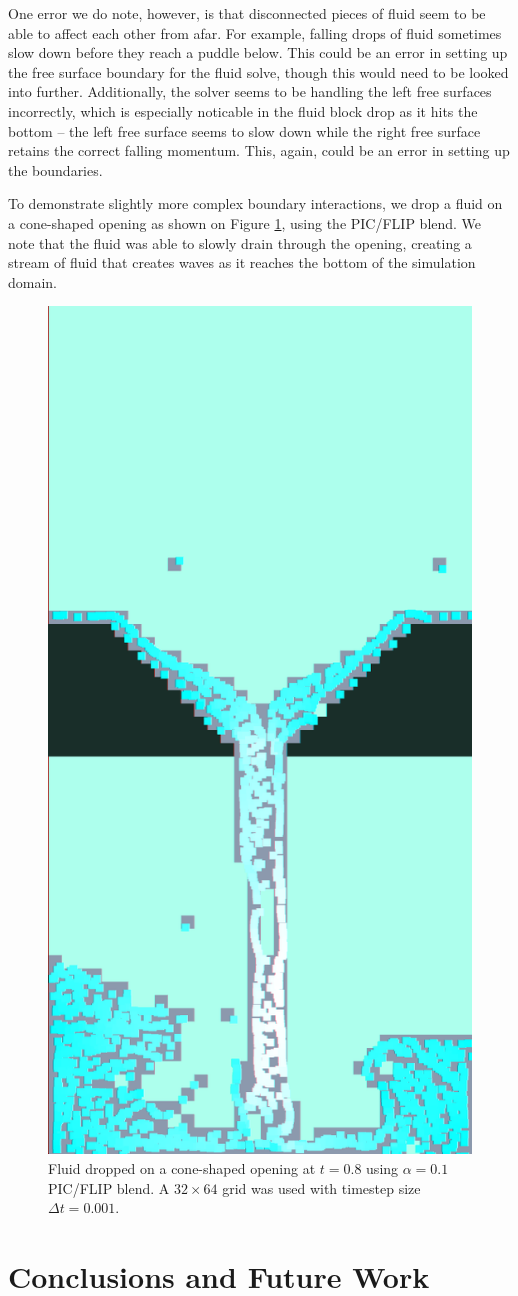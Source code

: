 \documentclass[sigconf]{acmart}
\begin{document}
One error we do note, however, is that disconnected pieces of fluid seem to be able to affect each other from afar. For example, falling drops of fluid sometimes slow down before they reach a puddle below. This could be an error in setting up the free surface boundary for the fluid solve, though this would need to be looked into further. Additionally, the solver seems to be handling the left free surfaces incorrectly, which is especially noticable in the fluid block drop as it hits the bottom -- the left free surface seems to slow down while the right free surface retains the correct falling momentum. This, again, could be an error in setting up the boundaries.

To demonstrate slightly more complex boundary interactions, we drop a fluid on a cone-shaped opening as shown on Figure \ref{fig:cone}, using the PIC/FLIP blend. We note that the fluid was able to slowly drain through the opening, creating a stream of fluid that creates waves as it reaches the bottom of the simulation domain.

\begin{figure}[ht]
  \centering
  \includegraphics[width=0.35\linewidth]{img/ConeCrop-0.png}
  \caption{Fluid dropped on a cone-shaped opening at $t=0.8$ using $\alpha{}=0.1$ PIC/FLIP blend. A $32\times{}64$ grid was used with timestep size $\Delta{}t=0.001$.} \label{fig:cone}
\end{figure}


\section{Conclusions and Future Work}
\end{document}
